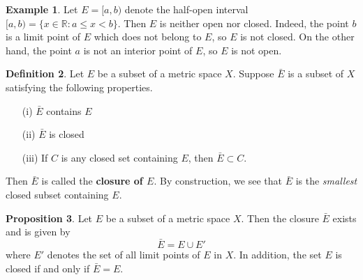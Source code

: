 \documentclass[12pt]{article}
\theoremstyle{definition}
\newtheorem{definition}{Definition}
\newtheorem{example}[definition]{Example}
\theoremstyle{theorem}
\newtheorem{proposition}[definition]{Proposition}
\begin{document}
\begin{example}
Let $E = [a,b)$ denote the half-open interval $[a,b) = \{x \in \mathbb{R} : a \leqslant x < b\}$. Then $E$ is neither open nor closed. Indeed, the point $b$ is a limit point of $E$ which does not belong to $E$, so $E$ is not closed. On the other hand, the point $a$ is not an interior point of $E$, so $E$ is not open. 
\end{example}

\begin{definition}
Let $E$ be a subset of a metric space $X$. Suppose $\bar{E}$ is a subset of $X$ satisfying the following properties. 
\begin{enumerate}
\item[(i)] $\bar{E}$ contains $E$
\item[(ii)] $\bar{E}$ is closed
\item[(iii)] If $C$ is any closed set containing $E$, then $\bar{E} \subset C$. 
\end{enumerate}
Then $\bar{E}$ is called the \textbf{closure of $E$}. By construction, we see that $\bar{E}$ is the \emph{smallest} closed subset containing $E$. 
\end{definition}

\begin{proposition}
Let $E$ be a subset of a metric space $X$. Then the closure $\bar{E}$ exists and is given by 
\[
\bar{E} = E \cup E'
\]
where $E'$ denotes the set of all limit points of $E$ in $X$. In addition, the set $E$ is closed if and only if $\bar{E} = E$. 
\end{proposition}
\end{document}
